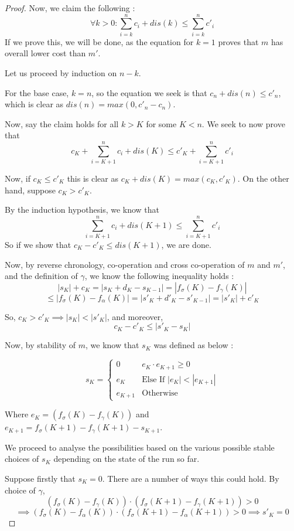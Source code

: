 \documentclass[conference]{IEEEtran}
\newcounter{cases}
\begin{document}
\begin{proof}
Now, we claim the following : $$\forall k > 0 : \sum_{i = k}^{n} c_i + dis(k) \leq \sum_{i=k}^{n} c'_i$$
If we prove this, we will be done, as the equation for $k=1$ proves that $m$ has overall lower cost than $m'$. 

Let us proceed by induction on $n-k$. 

For the base case, $k = n$, so the equation we seek is that $c_n + dis(n) \leq c'_n$, which is clear as $dis(n) = max(0, c'_n - c_n)$. 

Now, say the claim holds for all $k > K$ for some $K < n$. We seek to now prove that $$c_K + \sum_{i = K+1}^{n} c_i + dis(K) \leq c'_K + \sum_{i = K+1}^{n} c'_i$$

Now, if $c_K \leq c'_K$ this is clear as $c_K + dis(K) = max(c_K, c'_K)$. On the other hand, suppose $c_K > c'_K$. 

By the induction hypothesis, we know that $$\sum_{i = K+1}^{n} c_i + dis(K+1) \leq \sum_{i = K+1}^{n} c'_i$$ So if we show that $c_K - c'_K \leq dis(K+1)$, we are done. 

Now, by reverse chronology, co-operation and cross co-operation of $m$ and $m'$, and the definition of $\gamma$, we know the following inequality holds : $$|s_{K}| + c_K = |s_K + d_K - s_{K-1}| = |f_\sigma(K) - f_\gamma(K)|$$ $$ \leq |f_\sigma(K) - f_\alpha(K)| =  |s'_K + d'_K - s'_{K-1}| = |s'_{K}| + c'_K$$

So, $c_K > c'_K \implies |s_K| < |s'_K|$, and moreover, $$c_K - c'_K \leq |s'_K - s_K|$$

Now, by stability of $m$, we know that $s_K$ was defined as below : 

$$s_K = \begin{cases}
0 & e_K \cdot e_{K+1} \geq 0 \\
e_K & \textrm{Else If } |e_K| < |e_{K+1}|\\
e_{K+1} & \textrm{Otherwise}
\end{cases}$$

Where $e_K =  (f_\sigma(K) - f_\gamma(K))$ and $e_{K+1} = f_\sigma(K+1) - f_\gamma(K+1) - s_{K+1}$. 

We proceed to analyse the possibilities based on the various possible stable choices of $s_K$ depending on the state of the run so far. 

Suppose firstly that $s_K = 0$. There are a number of ways this could hold. By choice of $\gamma$, $$(f_\sigma(K) - f_\gamma(K))\cdot (f_\sigma(K+1) - f_\gamma(K+1)) > 0 $$$$ \implies (f_\sigma(K) - f_\alpha(K))\cdot (f_\sigma(K+1) - f_\alpha(K+1)) > 0 \implies s'_K = 0$$


\end{proof}
\end{document}

